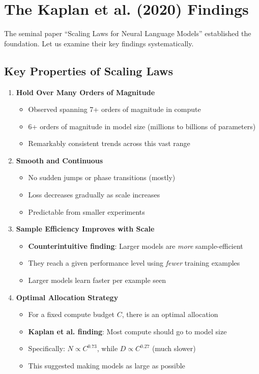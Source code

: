 \documentclass{article}
\begin{document}
\section{The Kaplan et al. (2020) Findings}

The seminal paper ``Scaling Laws for Neural Language Models'' \cite{kaplan2020scaling} established the foundation. Let us examine their key findings systematically.

\subsection{Key Properties of Scaling Laws}

\begin{enumerate}
\item \textbf{Hold Over Many Orders of Magnitude}
\begin{itemize}
\item Observed spanning 7+ orders of magnitude in compute
\item 6+ orders of magnitude in model size (millions to billions of parameters)
\item Remarkably consistent trends across this vast range
\end{itemize}

\item \textbf{Smooth and Continuous}
\begin{itemize}
\item No sudden jumps or phase transitions (mostly)
\item Loss decreases gradually as scale increases
\item Predictable from smaller experiments
\end{itemize}

\item \textbf{Sample Efficiency Improves with Scale}
\begin{itemize}
\item \textbf{Counterintuitive finding}: Larger models are \textit{more} sample-efficient
\item They reach a given performance level using \textit{fewer} training examples
\item Larger models learn faster per example seen
\end{itemize}

\item \textbf{Optimal Allocation Strategy}
\begin{itemize}
\item For a fixed compute budget $C$, there is an optimal allocation
\item \textbf{Kaplan et al. finding}: Most compute should go to model size
\item Specifically: $N \propto C^{0.73}$, while $D \propto C^{0.27}$ (much slower)
\item This suggested making models as large as possible
\end{itemize}


\end{enumerate}
\end{document}
